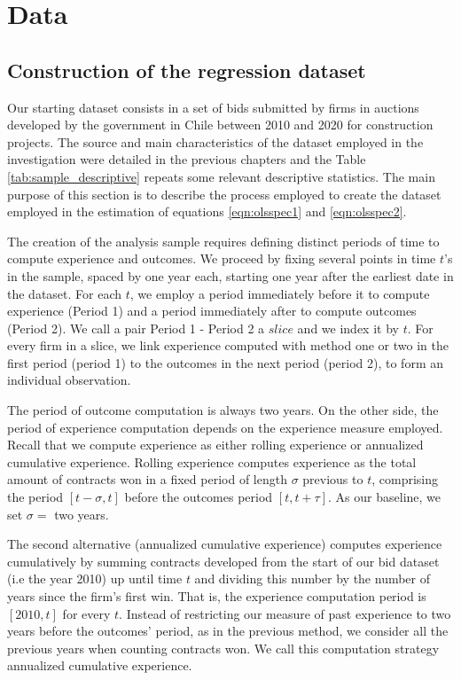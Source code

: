 \section{Data}
\subsection{Construction of the regression dataset}

\label{section:main_data}
Our starting dataset consists in a set of bids submitted by firms in auctions developed by the government in Chile between 2010 and 2020 for construction projects. The source and main characteristics of the dataset employed in the investigation were detailed in the previous chapters and the Table \ref{tab:sample_descriptive} repeats some relevant descriptive statistics. The main purpose of this section is to describe the process employed to create the dataset employed in the estimation of equations \ref{eqn:olsspec1} and \ref{eqn:olsspec2}.



The creation of the analysis sample requires defining distinct periods of time to compute experience and outcomes. We proceed by fixing several points in time $t$'s in the sample, spaced by one year each, starting one year after the earliest date in the dataset. For each $t$, we employ a period immediately before it to compute experience (Period 1) and a period immediately after to compute outcomes (Period 2). We call a pair Period 1 - Period 2 a $slice$ and we index it by $t$. For every firm in a slice, we link experience computed with method one or two  in the first period (period 1) to the outcomes in the next period (period 2), to form an individual observation.

The period of outcome computation is always two years. On the other side, the period of experience computation depends on the experience measure employed. Recall that we compute experience as either rolling experience or annualized cumulative experience. Rolling experience computes experience as the total amount of contracts won in a fixed period of length $\sigma$ previous to $t$, comprising the period $[t-\sigma,t]$ before the outcomes period $[t,t+\tau]$. As our baseline, we set $\sigma=$ two years.

The second alternative (annualized cumulative experience) computes experience cumulatively by summing contracts developed from the start of our bid dataset (i.e the year 2010) up until time $t$ and dividing this number by the number of years since the firm's first win. That is, the experience computation period is $[2010, t]$ for every $t$. Instead of restricting our measure of past experience to two years before the outcomes' period, as in the previous method, we consider all the previous years when counting contracts won. We call this computation strategy annualized cumulative experience.

